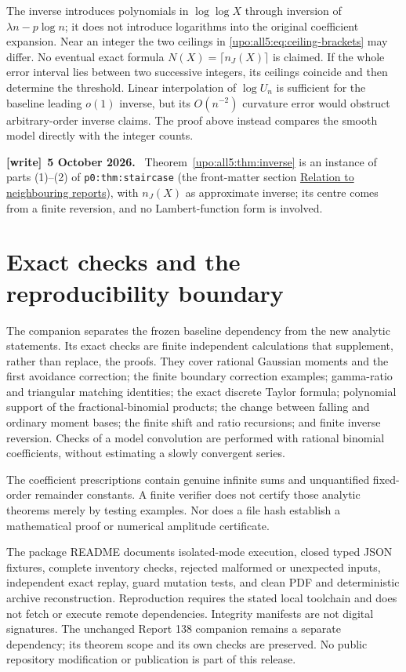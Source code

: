 \documentclass[11pt,letterpaper]{article}
\theoremstyle{remark}\newtheorem{remark}[theorem]{Remark}
\numberwithin{equation}{section}
\newenvironment{writenote}[1][]{\par\smallskip\begingroup\small
 \noindent\textbf{[write]}\if\relax\detokenize{#1}\relax\else~\textbf{#1.}\fi\ }%
 {\par\endgroup\smallskip}
\begin{document}
The inverse introduces polynomials in $\log\log X$ through inversion
of $\lambda n-p\log n$; it does not introduce logarithms into the
original coefficient expansion. Near an integer the two ceilings
in \eqref{upo:all5:eq:ceiling-brackets} may differ. No eventual exact formula
$N(X)=\lceil n_J(X)\rceil$ is claimed. If the whole error interval
lies between two successive integers, its ceilings coincide and
then determine the threshold. Linear interpolation of $\log U_n$
is sufficient for the baseline leading $o(1)$ inverse, but its
$O(n^{-2})$ curvature error would obstruct arbitrary-order inverse
claims. The proof above instead compares the smooth model directly
with the integer counts.
\begin{writenote}[5 October 2026]
Theorem~\ref{upo:all5:thm:inverse} is an instance of parts (1)--(2) of \texttt{p0:thm:staircase} (the front-matter section \hyperref[upo:sec:neighbours]{Relation to neighbouring reports}), with $n_J(X)$ as approximate inverse; its centre comes from a finite reversion, and no Lambert-function form is involved.
\end{writenote}

\section{Exact checks and the reproducibility boundary}\label{upo:all5:sec:reproduction}
The companion separates the frozen baseline dependency from the new
analytic statements. Its exact checks are finite independent
calculations that supplement, rather than replace, the proofs.
They cover rational Gaussian moments and the first avoidance
correction; the finite boundary correction examples; gamma-ratio
and triangular matching identities; the exact discrete Taylor
formula; polynomial support of the fractional-binomial products;
the change between falling and ordinary moment bases; the finite
shift and ratio recursions; and finite inverse reversion.
Checks of a model convolution are performed with rational binomial
coefficients, without estimating a slowly convergent series.

The coefficient prescriptions contain genuine infinite sums and
unquantified fixed-order remainder constants. A finite verifier
does not certify those analytic theorems merely by testing examples.
Nor does a file hash establish a mathematical proof or numerical
amplitude certificate.

The package README documents isolated-mode execution, closed typed
JSON fixtures, complete inventory checks, rejected malformed or
unexpected inputs, independent exact replay, guard mutation tests,
and clean PDF and deterministic archive reconstruction. Reproduction
requires the stated local toolchain and does not fetch or execute
remote dependencies. Integrity manifests are not digital signatures.
The unchanged Report 138 companion remains a separate dependency;
its theorem scope and its own checks are preserved. No public
repository modification or publication is part of this release.
\end{document}
